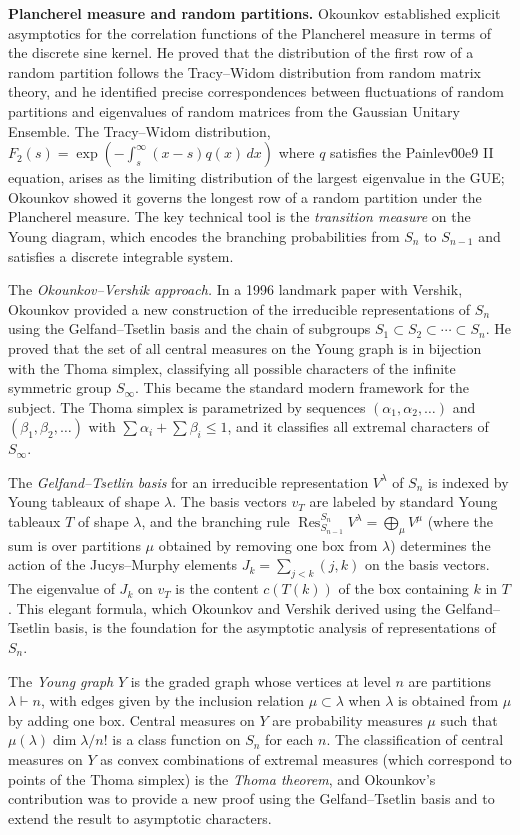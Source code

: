 \textbf{Plancherel measure and random partitions.} Okounkov established explicit asymptotics for the correlation functions of the Plancherel measure in terms of the discrete sine kernel. He proved that the distribution of the first row of a random partition follows the Tracy--Widom distribution from random matrix theory, and he identified precise correspondences between fluctuations of random partitions and eigenvalues of random matrices from the Gaussian Unitary Ensemble. The Tracy--Widom distribution, $F_2(s) = \exp(-\int_s^\infty (x-s)q(x)\,dx)$ where $q$ satisfies the Painlev\u00e9 II equation, arises as the limiting distribution of the largest eigenvalue in the GUE; Okounkov showed it governs the longest row of a random partition under the Plancherel measure. The key technical tool is the \emph{transition measure} on the Young diagram, which encodes the branching probabilities from $S_n$ to $S_{n-1}$ and satisfies a discrete integrable system.

The \emph{Okounkov--Vershik approach.} In a 1996 landmark paper with Vershik, Okounkov provided a new construction of the irreducible representations of $S_n$ using the Gelfand--Tsetlin basis and the chain of subgroups $S_1 \subset S_2 \subset \cdots \subset S_n$. He proved that the set of all central measures on the Young graph is in bijection with the Thoma simplex, classifying all possible characters of the infinite symmetric group $S_\infty$. This became the standard modern framework for the subject. The Thoma simplex is parametrized by sequences $(\alpha_1, \alpha_2, \ldots)$ and $(\beta_1, \beta_2, \ldots)$ with $\sum \alpha_i + \sum \beta_i \le 1$, and it classifies all extremal characters of $S_\infty$.

The \emph{Gelfand--Tsetlin basis} for an irreducible representation $V^\lambda$ of $S_n$ is indexed by Young tableaux of shape $\lambda$. The basis vectors $v_T$ are labeled by standard Young tableaux $T$ of shape $\lambda$, and the branching rule $\operatorname{Res}^{S_n}_{S_{n-1}} V^\lambda = \bigoplus_{\mu} V^\mu$ (where the sum is over partitions $\mu$ obtained by removing one box from $\lambda$) determines the action of the Jucys--Murphy elements $J_k = \sum_{j < k} (j,k)$ on the basis vectors. The eigenvalue of $J_k$ on $v_T$ is the content $c(T(k))$ of the box containing $k$ in $T$. This elegant formula, which Okounkov and Vershik derived using the Gelfand--Tsetlin basis, is the foundation for the asymptotic analysis of representations of $S_n$.

The \emph{Young graph} $Y$ is the graded graph whose vertices at level $n$ are partitions $\lambda \vdash n$, with edges given by the inclusion relation $\mu \subset \lambda$ when $\lambda$ is obtained from $\mu$ by adding one box. Central measures on $Y$ are probability measures $\mu$ such that $\mu(\lambda) \dim \lambda / n!$ is a class function on $S_n$ for each $n$. The classification of central measures on $Y$ as convex combinations of extremal measures (which correspond to points of the Thoma simplex) is the \emph{Thoma theorem}, and Okounkov's contribution was to provide a new proof using the Gelfand--Tsetlin basis and to extend the result to asymptotic characters.

